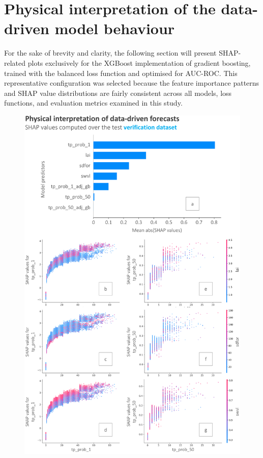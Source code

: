 \section{Physical interpretation of the data-driven model behaviour}
\label{data_driven_flash_floods_short_medium_range_physical_interpretation}

For the sake of brevity and clarity, the following section will present SHAP-related plots exclusively for the XGBoost implementation of gradient boosting, trained with the balanced loss function and optimised for AUC-ROC. This representative configuration was selected because the feature importance patterns and SHAP value distributions are fairly consistent across all models, loss functions, and evaluation metrics examined in this study. 

\begin{figure}[htbp]
\centering
\includegraphics[width=\textwidth]{shap.png}

\end{figure}
